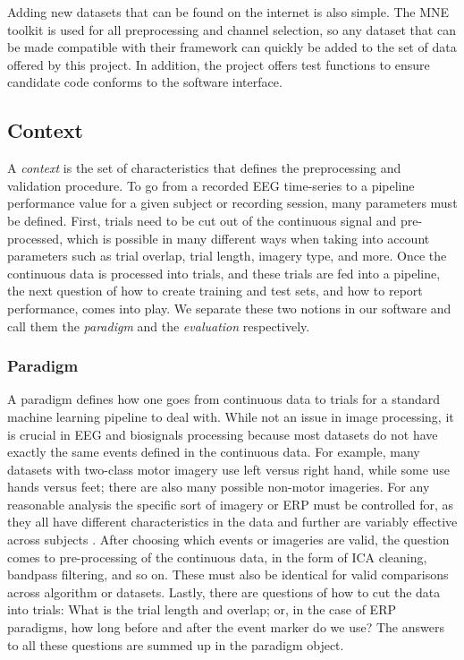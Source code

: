 Adding new datasets that can be found on the internet is also
simple. The MNE toolkit \cite{Gramfort2014,Gramfort2013} is used for
all preprocessing and channel selection, so any dataset that can be
made compatible with their framework can quickly be added to the set
of data offered by this project. In addition, the project offers test
functions to ensure candidate code conforms to the software interface.

\subsection{Context}

A \emph{context} is the set of characteristics that defines the
preprocessing and validation procedure. To go from a recorded EEG
time-series to a pipeline performance value for a given subject or
recording session, many parameters must be defined. First, trials need to be
cut out of the continuous signal and pre-processed, which is
possible in many different ways when taking into account parameters such as
trial overlap, trial length, imagery type, and more. Once the
continuous data is processed into trials, and these trials are fed
into a pipeline, the next question of how to create training and test sets,
and how to report performance, comes into play. We separate these two
notions in our software and call them the \emph{paradigm} and the
\emph{evaluation} respectively.

\subsubsection{Paradigm}

A paradigm defines how one goes from continuous data to trials for a
standard machine learning pipeline to deal with. While not an issue
in image processing, it is crucial in EEG and biosignals processing
because most datasets do not have exactly the same events defined in
the continuous data. For example, many datasets with two-class motor imagery use left versus right hand, while some use hands versus feet; 
there are also many possible non-motor imageries. For any reasonable
analysis the specific sort of imagery or ERP must be controlled for,
as they all have different characteristics in the data and further are
variably effective across subjects \cite{Scherer2015,Allison2010}. After choosing
which events or imageries are valid, the question comes to
pre-processing of the continuous data, in the form of ICA cleaning,
bandpass filtering, and so on. These must also be identical for valid
comparisons across algorithm or datasets. Lastly, there are questions
of how to cut the data into trials: What is the trial length and
overlap; or, in the case of ERP paradigms, how long before and after
the event marker do we use? The answers to all these questions are
summed up in the paradigm object.


